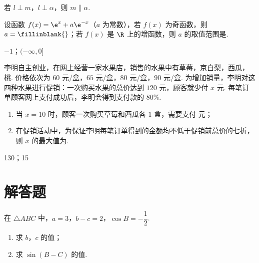 \begin{answer}
若 \(l\perp m\)，\(l\perp\alpha\)，则 \(m\parallel\alpha\).
\end{answer}



\begin{problem}
设函数 \(f(x)=\e^x+a\e^{-x}\)（\(a\) 为常数），若 \(f(x)\) 为奇函数，则 \(a=\fillinblank{}\)；若 \(f(x)\) 是 \(\R\) 上的增函数，则 \(a\) 的取值范围是\fillinblank{}.
\end{problem}

\begin{answer}
\(-1\)；\((-\infty,0]\)
\end{answer}



\begin{problem}
李明自主创业，在网上经营一家水果店，销售的水果中有草莓，京白梨，西瓜，桃. 价格依次为 \(60\) 元/盒，\(65\) 元/盒，\(80\) 元/盒，\(90\) 元/盒. 为增加销量，李明对这四种水果进行促销：一次购买水果的总价达到 \(120\) 元，顾客就少付 \(x\) 元. 每笔订单顾客网上支付成功后，李明会得到支付款的 \(80\%\).

\begin{enumerate}
\item 当 \(x=10\) 时，顾客一次购买草莓和西瓜各 \(1\) 盒，需要支付\fillinblank{} 元；

\item 在促销活动中，为保证李明每笔订单得到的金额均不低于促销前总价的七折，则 \(x\) 的最大值为\fillinblank{}.
\end{enumerate}
\end{problem}

\begin{answer}
130；15
\end{answer}


\section{解答题}

\begin{problem}
在 \(\triangle ABC\) 中，\(a=3\)，\(b-c=2\)，\(\cos B=-\dfrac12\).

\begin{enumerate}
\item 求 \(b\)，\(c\) 的值；

\item 求 \(\sin(B-C)\) 的值.
\end{enumerate}
\end{problem}

